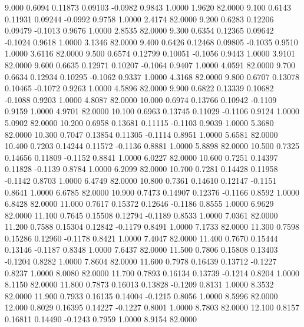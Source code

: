    9.000   0.6094   0.11873   0.09103  -0.0982   0.9843   1.0000   1.9620  82.0000
   9.100   0.6143   0.11931   0.09244  -0.0992   0.9758   1.0000   2.4174  82.0000
   9.200   0.6283   0.12206   0.09479  -0.1013   0.9676   1.0000   2.8535  82.0000
   9.300   0.6354   0.12365   0.09642  -0.1024   0.9618   1.0000   3.1346  82.0000
   9.400   0.6426   0.12468   0.09805  -0.1035   0.9510   1.0000   3.6116  82.0000
   9.500   0.6574   0.12799   0.10051  -0.1056   0.9443   1.0000   3.9101  82.0000
   9.600   0.6635   0.12971   0.10207  -0.1064   0.9407   1.0000   4.0591  82.0000
   9.700   0.6634   0.12934   0.10295  -0.1062   0.9337   1.0000   4.3168  82.0000
   9.800   0.6707   0.13078   0.10465  -0.1072   0.9263   1.0000   4.5896  82.0000
   9.900   0.6822   0.13339   0.10682  -0.1088   0.9203   1.0000   4.8087  82.0000
  10.000   0.6974   0.13766   0.10942  -0.1109   0.9159   1.0000   4.9701  82.0000
  10.100   0.6963   0.13745   0.11029  -0.1106   0.9124   1.0000   5.0902  82.0000
  10.200   0.6958   0.13681   0.11115  -0.1103   0.9039   1.0000   5.3680  82.0000
  10.300   0.7047   0.13854   0.11305  -0.1114   0.8951   1.0000   5.6581  82.0000
  10.400   0.7203   0.14244   0.11572  -0.1136   0.8881   1.0000   5.8898  82.0000
  10.500   0.7325   0.14656   0.11809  -0.1152   0.8841   1.0000   6.0227  82.0000
  10.600   0.7251   0.14397   0.11828  -0.1139   0.8784   1.0000   6.2099  82.0000
  10.700   0.7281   0.14428   0.11958  -0.1142   0.8703   1.0000   6.4749  82.0000
  10.800   0.7361   0.14610   0.12147  -0.1151   0.8641   1.0000   6.6785  82.0000
  10.900   0.7473   0.14907   0.12376  -0.1166   0.8592   1.0000   6.8428  82.0000
  11.000   0.7617   0.15372   0.12646  -0.1186   0.8555   1.0000   6.9629  82.0000
  11.100   0.7645   0.15508   0.12794  -0.1189   0.8533   1.0000   7.0361  82.0000
  11.200   0.7588   0.15304   0.12842  -0.1179   0.8491   1.0000   7.1733  82.0000
  11.300   0.7598   0.15286   0.12960  -0.1178   0.8421   1.0000   7.4047  82.0000
  11.400   0.7670   0.15444   0.13146  -0.1187   0.8348   1.0000   7.6437  82.0000
  11.500   0.7806   0.15808   0.13403  -0.1204   0.8282   1.0000   7.8604  82.0000
  11.600   0.7978   0.16439   0.13712  -0.1227   0.8237   1.0000   8.0080  82.0000
  11.700   0.7893   0.16134   0.13739  -0.1214   0.8204   1.0000   8.1150  82.0000
  11.800   0.7873   0.16013   0.13828  -0.1209   0.8131   1.0000   8.3532  82.0000
  11.900   0.7933   0.16135   0.14004  -0.1215   0.8056   1.0000   8.5996  82.0000
  12.000   0.8029   0.16395   0.14227  -0.1227   0.8001   1.0000   8.7803  82.0000
  12.100   0.8157   0.16811   0.14490  -0.1243   0.7959   1.0000   8.9154  82.0000
